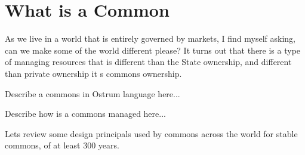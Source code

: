 \documentclass{article}
\begin{document}
\pagebreak

\section{What is a Common}

\vspace{0.2cm}

As we live in a world that is entirely governed by markets, I find myself asking, can we make some of the world different please? It turns out that there is a type of managing resources that is different than the State ownership, and different than private ownership it s commons ownership. 

Describe a commons in Ostrum language here...

Describe how is a commons managed here...


Lets review some design principals used by commons across the world for stable commons, of at least 300 years. 
\end{document}
